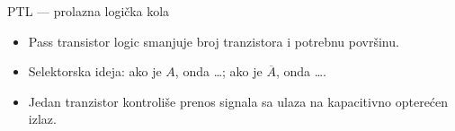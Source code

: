 \begin{frame}[label=09_3-s050]{PTL — prolazna logička kola}
\begin{itemize}
\item Pass transistor logic smanjuje broj tranzistora i potrebnu površinu.
\item Selektorska ideja: ako je $A$, onda …; ako je $\overline A$, onda ….
\item Jedan tranzistor kontroliše prenos signala sa ulaza na kapacitivno opterećen izlaz.
\end{itemize}\begin{center}

\end{center}
\end{frame}
